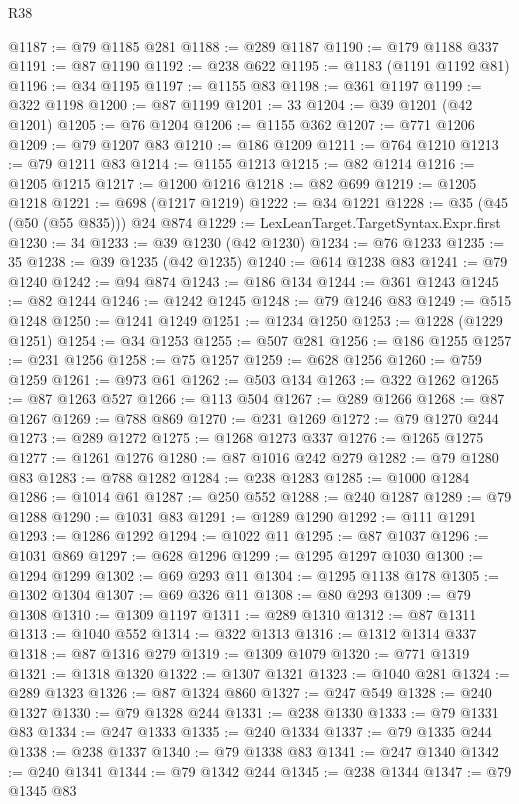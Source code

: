 \begin{lexlean}{R38}
\begin{coremodule}
@1187 := @79 @1185 @281
@1188 := @289 @1187
@1190 := @179 @1188 @337
@1191 := @87 @1190
@1192 := @238 @622
@1195 := @1183 (@1191 @1192 @81)
@1196 := @34 @1195
@1197 := @1155 @83
@1198 := @361 @1197
@1199 := @322 @1198
@1200 := @87 @1199
@1201 := 33
@1204 := @39 @1201 (@42 @1201)
@1205 := @76 @1204
@1206 := @1155 @362
@1207 := @771 @1206
@1209 := @79 @1207 @83
@1210 := @186 @1209
@1211 := @764 @1210
@1213 := @79 @1211 @83
@1214 := @1155 @1213
@1215 := @82 @1214
@1216 := @1205 @1215
@1217 := @1200 @1216
@1218 := @82 @699
@1219 := @1205 @1218
@1221 := @698 (@1217 @1219)
@1222 := @34 @1221
@1228 := @35 (@45 (@50 (@55 @835))) @24 @874
@1229 := LexLeanTarget.TargetSyntax.Expr.first
@1230 := 34
@1233 := @39 @1230 (@42 @1230)
@1234 := @76 @1233
@1235 := 35
@1238 := @39 @1235 (@42 @1235)
@1240 := @614 @1238 @83
@1241 := @79 @1240
@1242 := @94 @874
@1243 := @186 @134
@1244 := @361 @1243
@1245 := @82 @1244
@1246 := @1242 @1245
@1248 := @79 @1246 @83
@1249 := @515 @1248
@1250 := @1241 @1249
@1251 := @1234 @1250
@1253 := @1228 (@1229 @1251)
@1254 := @34 @1253
@1255 := @507 @281
@1256 := @186 @1255
@1257 := @231 @1256
@1258 := @75 @1257
@1259 := @628 @1256
@1260 := @759 @1259
@1261 := @973 @61
@1262 := @503 @134
@1263 := @322 @1262
@1265 := @87 @1263 @527
@1266 := @113 @504
@1267 := @289 @1266
@1268 := @87 @1267
@1269 := @788 @869
@1270 := @231 @1269
@1272 := @79 @1270 @244
@1273 := @289 @1272
@1275 := @1268 @1273 @337
@1276 := @1265 @1275
@1277 := @1261 @1276
@1280 := @87 @1016 @242 @279
@1282 := @79 @1280 @83
@1283 := @788 @1282
@1284 := @238 @1283
@1285 := @1000 @1284
@1286 := @1014 @61
@1287 := @250 @552
@1288 := @240 @1287
@1289 := @79 @1288
@1290 := @1031 @83
@1291 := @1289 @1290
@1292 := @111 @1291
@1293 := @1286 @1292
@1294 := @1022 @11
@1295 := @87 @1037
@1296 := @1031 @869
@1297 := @628 @1296
@1299 := @1295 @1297 @1030
@1300 := @1294 @1299
@1302 := @69 @293 @11
@1304 := @1295 @1138 @178
@1305 := @1302 @1304
@1307 := @69 @326 @11
@1308 := @80 @293
@1309 := @79 @1308
@1310 := @1309 @1197
@1311 := @289 @1310
@1312 := @87 @1311
@1313 := @1040 @552
@1314 := @322 @1313
@1316 := @1312 @1314 @337
@1318 := @87 @1316 @279
@1319 := @1309 @1079
@1320 := @771 @1319
@1321 := @1318 @1320
@1322 := @1307 @1321
@1323 := @1040 @281
@1324 := @289 @1323
@1326 := @87 @1324 @860
@1327 := @247 @549
@1328 := @240 @1327
@1330 := @79 @1328 @244
@1331 := @238 @1330
@1333 := @79 @1331 @83
@1334 := @247 @1333
@1335 := @240 @1334
@1337 := @79 @1335 @244
@1338 := @238 @1337
@1340 := @79 @1338 @83
@1341 := @247 @1340
@1342 := @240 @1341
@1344 := @79 @1342 @244
@1345 := @238 @1344
@1347 := @79 @1345 @83

\end{coremodule}
\end{lexlean}
